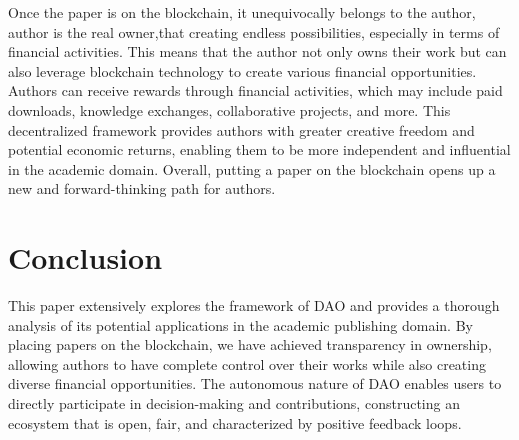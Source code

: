 \documentclass[lettersize,journal]{IEEEtran}
\begin{document}



Once the paper is on the blockchain, it unequivocally belongs to the author, author is the real owner,that creating endless possibilities, especially in terms of financial activities. This means that the author not only owns their work but can also leverage blockchain technology to create various financial opportunities. Authors can receive rewards through financial activities, which may include paid downloads, knowledge exchanges, collaborative projects, and more. This decentralized framework provides authors with greater creative freedom and potential economic returns, enabling them to be more independent and influential in the academic domain. Overall, putting a paper on the blockchain opens up a new and forward-thinking path for authors.



\section{Conclusion}
This paper extensively explores the framework of DAO and provides a thorough analysis of its potential applications in the academic publishing domain. By placing papers on the blockchain, we have achieved transparency in ownership, allowing authors to have complete control over their works while also creating diverse financial opportunities. The autonomous nature of DAO enables users to directly participate in decision-making and contributions, constructing an ecosystem that is open, fair, and characterized by positive feedback loops.
\end{document}
